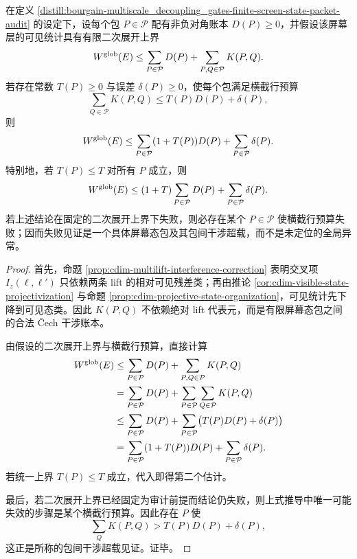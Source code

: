 \begin{proposition}[横截干涉预算推出有限屏幕全局估计分解]\label{distill:bourgain-multiscale_decoupling_gates-finite-screen-state-packet-overlap-decomposition}
在定义 \ref{distill:bourgain-multiscale_decoupling_gates-finite-screen-state-packet-audit} 的设定下，设每个包 \(P\in\mathcal P\) 配有非负对角账本 \(D(P)\ge0\)，并假设该屏幕层的可见统计具有有限二次展开上界
\[
W^{\rm glob}(E)
\le
\sum_{P\in\mathcal P}D(P)+
\sum_{P,Q\in\mathcal P}K(P,Q).
\]
若存在常数 \(T(P)\ge0\) 与误差 \(\delta(P)\ge0\)，使每个包满足横截行预算
\[
\sum_{Q\in\mathcal P}K(P,Q)
\le T(P)D(P)+\delta(P),
\]
则
\[
W^{\rm glob}(E)
\le
\sum_{P\in\mathcal P}(1+T(P))D(P)+
\sum_{P\in\mathcal P}\delta(P).
\]
特别地，若 \(T(P)\le T\) 对所有 \(P\) 成立，则
\[
W^{\rm glob}(E)
\le
(1+T)\sum_{P\in\mathcal P}D(P)+
\sum_{P\in\mathcal P}\delta(P).
\]
若上述结论在固定的二次展开上界下失败，则必存在某个 \(P\in\mathcal P\) 使横截行预算失败；因而失败见证是一个具体屏幕态包及其包间干涉超载，而不是未定位的全局异常。
\end{proposition}
\begin{proof}
首先，命题 \ref{prop:cdim-multilift-interference-correction} 表明交叉项 \(I_z(\ell,
\ell')\) 只依赖两条 lift 的相对可见残差类；再由推论 \ref{cor:cdim-visible-state-projectivization} 与命题 \ref{prop:cdim-projective-state-organization}，可见统计先下降到可见态类。因此 \(K(P,Q)\) 不依赖绝对 lift 代表元，而是有限屏幕态包之间的合法 \v Cech 干涉账本。

由假设的二次展开上界与横截行预算，直接计算
\[
\begin{aligned}
W^{\rm glob}(E)
&\le
\sum_{P\in\mathcal P}D(P)+
\sum_{P,Q\in\mathcal P}K(P,Q)\\
&=
\sum_{P\in\mathcal P}D(P)+
\sum_{P\in\mathcal P}\sum_{Q\in\mathcal P}K(P,Q)\\
&\le
\sum_{P\in\mathcal P}D(P)+
\sum_{P\in\mathcal P}\bigl(T(P)D(P)+\delta(P)\bigr)\\
&=
\sum_{P\in\mathcal P}(1+T(P))D(P)+
\sum_{P\in\mathcal P}\delta(P).
\end{aligned}
\]
若统一上界 \(T(P)\le T\) 成立，代入即得第二个估计。

最后，若二次展开上界已经固定为审计前提而结论仍失败，则上式推导中唯一可能失效的步骤是某个横截行预算。因此存在 \(P\) 使
\[
\sum_QK(P,Q)>T(P)D(P)+\delta(P),
\]
这正是所称的包间干涉超载见证。证毕。
\end{proof}


\endinput
